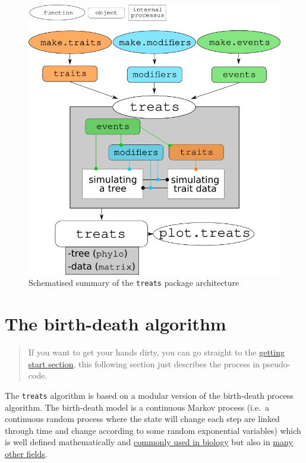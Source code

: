 \documentclass[
]{book}
\begin{document}
\begin{figure}
\centering
\includegraphics{treats_structure.png}
\caption{Schematised summary of the \texttt{treats} package architecture}
\end{figure}

\hypertarget{bdalgorithm}{%
\section{The birth-death algorithm}\label{bdalgorithm}}

\begin{quote}
If you want to get your hands dirty, you can go straight to the \protect\hyperlink{gettingstarted}{getting start section}, this following section just describes the process in pseudo-code.
\end{quote}

The \texttt{treats} algorithm is based on a modular version of the birth-death process algorithm.
The birth-death model is a continuous Markov process (i.e.~a continuous random process where the state will change each step are linked through time and change according to some random exponential variables) which is well defined mathematically and \href{https://lukejharmon.github.io/pcm/chapter10_birthdeath/\#section-10.2-the-birth-death-model}{commonly used in biology} but also in \href{https://en.wikipedia.org/wiki/Birth\%E2\%80\%93death_process}{many other fields}.
\end{document}
